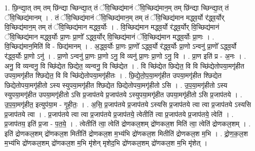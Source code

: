 \documentclass[17pt]{extarticle}
\begin{document}
1. छि॒न्द्या॒त् तम् तम् छि॑न्द्या च्छिन्द्या॒त् तं ॅवि॒च्छिद्य॑मानं ॅवि॒च्छिद्य॑मान॒म् तम् छि॑न्द्या च्छिन्द्या॒त् तं ॅवि॒च्छिद्य॑मानम् । . तं ॅवि॒च्छिद्य॑मानं ॅवि॒च्छिद्य॑मान॒म् तम् तं ॅवि॒च्छिद्य॑मान मद्ध्व॒र्यो र॑द्ध्व॒र्योर् वि॒च्छिद्य॑मान॒म् तम् तं ॅवि॒च्छिद्य॑मान मद्ध्व॒र्योः । . वि॒च्छिद्य॑मान मद्ध्व॒र्यो र॑द्ध्व॒र्योर् वि॒च्छिद्य॑मानं ॅवि॒च्छिद्य॑मान मद्ध्व॒र्योः प्रा॒णः प्रा॒णो᳚ ऽद्ध्व॒र्योर् वि॒च्छिद्य॑मानं ॅवि॒च्छिद्य॑मान मद्ध्व॒र्योः प्रा॒णः । . वि॒च्छिद्य॑मान॒मिति॑ वि - छिद्य॑मानम् । . अ॒द्ध्व॒र्योः प्रा॒णः प्रा॒णो᳚ ऽद्ध्व॒र्यो र॑द्ध्व॒र्योः प्रा॒णो ऽन्वनु॑ प्रा॒णो᳚ ऽद्ध्व॒र्यो र॑द्ध्व॒र्योः प्रा॒णो ऽनु॑ । . प्रा॒णो ऽन्वनु॑ प्रा॒णः प्रा॒णो ऽनु॒ वि व्यनु॑ प्रा॒णः प्रा॒णो ऽनु॒ वि । . प्रा॒ण इति॑ प्र - अ॒नः । . अनु॒ वि व्यन्वनु॒ वि च्छि॑द्येत छिद्येत॒ व्यन्वनु॒ वि च्छि॑द्येत । . वि च्छि॑द्येत छिद्येत॒ वि वि च्छि॑द्येतोपया॒मगृ॑हीत उपया॒मगृ॑हीत श्छिद्येत॒ वि वि च्छि॑द्येतोपया॒मगृ॑हीतः । . छि॒द्ये॒तो॒प॒या॒मगृ॑हीत उपया॒मगृ॑हीत श्छिद्येत छिद्येतोपया॒मगृ॑हीतो ऽस्य स्युपया॒मगृ॑हीत श्छिद्येत छिद्येतोपया॒मगृ॑हीतो ऽसि । . उ॒प॒या॒मगृ॑हीतो ऽस्य स्युपया॒मगृ॑हीत उपया॒मगृ॑हीतो ऽसि प्र॒जाप॑तये प्र॒जाप॑तये ऽस्युपया॒मगृ॑हीत उपया॒मगृ॑हीतो ऽसि प्र॒जाप॑तये । . उ॒प॒या॒मगृ॑हीत॒ इत्युप॑या॒म - गृ॒ही॒तः॒ । . अ॒सि॒ प्र॒जाप॑तये प्र॒जाप॑तये ऽस्यसि प्र॒जाप॑तये त्वा त्वा प्र॒जाप॑तये ऽस्यसि प्र॒जाप॑तये त्वा । . प्र॒जाप॑तये त्वा त्वा प्र॒जाप॑तये प्र॒जाप॑तये॒ त्वेतीति॑ त्वा प्र॒जाप॑तये प्र॒जाप॑तये॒ त्वेति॑ । . प्र॒जाप॑तय॒ इति॑ प्र॒जा - प॒त॒ये॒ । . त्वेतीति॑ त्वा॒ त्वेति॑ द्रोणकल॒शम् द्रो॑णकल॒श मिति॑ त्वा॒ त्वेति॑ द्रोणकल॒शम् । . इति॑ द्रोणकल॒शम् द्रो॑णकल॒श मितीति॑ द्रोणकल॒श म॒भ्य॑भि द्रो॑णकल॒श मितीति॑ द्रोणकल॒श म॒भि । . द्रो॒ण॒क॒ल॒श म॒भ्य॑भि द्रो॑णकल॒शम् द्रो॑णकल॒श म॒भि मृ॑शेन् मृशेद॒भि द्रो॑णकल॒शम् द्रो॑णकल॒श म॒भि मृ॑शेत् । \newline
\end{document}
